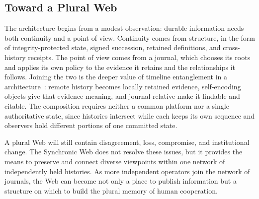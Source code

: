 \subsection{Toward a Plural Web}

The architecture begins from a modest observation: durable information needs both continuity and a point of view. Continuity comes from structure, in the form of integrity-protected state, signed succession, retained definitions, and cross-history receipts. The point of view comes from a journal, which chooses its roots and applies its own policy to the evidence it retains and the relationships it follows. Joining the two is the deeper value of timeline entanglement in a  architecture~\cite{Maniatis2002timeline}: remote history becomes locally retained evidence, self-encoding objects give that evidence meaning, and journal-relative  make it findable and citable. The composition requires neither a common platform nor a single authoritative state, since histories intersect while each keeps its own sequence and observers hold different portions of one committed state.

A plural Web will still contain disagreement, loss, compromise, and institutional change. The Synchronic Web does not resolve these issues, but it provides the means to preserve and connect diverse viewpoints within one network of independently held histories. As more independent operators join the network of journals, the Web can become not only a place to publish information but a structure on which to build the plural memory of human cooperation.
